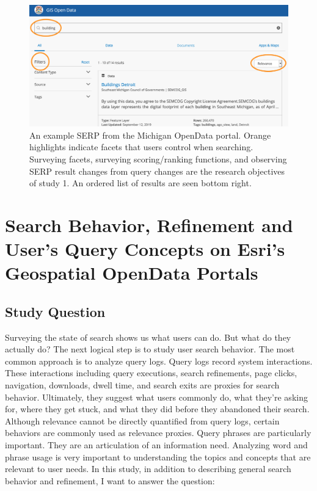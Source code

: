 \begin{figure}[H]
    \centering
    \includegraphics[width=1\textwidth]{../figures/Methods_OpenData.png}
    \caption{An example SERP from the Michigan OpenData portal. Orange highlights indicate facets that users control when searching. Surveying facets, surveying scoring/ranking functions, and observing SERP result changes from query changes are the research objectives of study 1. An ordered list of results are seen bottom right.}
    \label{fig:Methods_OpenData}
\end{figure}

\section{Search Behavior, Refinement and User's Query Concepts on Esri’s Geospatial OpenData Portals}

\subsection{Study Question}

Surveying the state of search shows us what users can do. But what do they actually do? The next logical step is to study user search behavior. The most common approach is to analyze query logs. Query logs record system interactions. These interactions including query executions, search refinements, page clicks, navigation, downloads, dwell time, and search exits are proxies for search behavior. Ultimately, they suggest what users commonly do, what they’re asking for, where they get stuck, and what they did before they abandoned their search. Although relevance cannot be directly quantified from query logs, certain behaviors are commonly used as relevance proxies. Query phrases are particularly important. They are an articulation of an information need. Analyzing word and phrase usage is very important to understanding the topics and concepts that are relevant to user needs. In this study, in addition to describing general search behavior and refinement, I want to answer the question:
\linebreak

